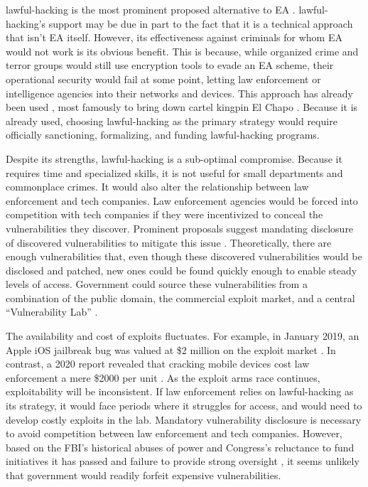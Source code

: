 \documentclass{IEEEtran}
\begin{document}
\Ac{lawful-hacking} is the most prominent proposed alternative to \ac{EA} \cite{bellovin_lawful_2013}
\cite{hennessey_lawful_2016} \cite{rozenshtein_wicked_2018} \cite{kerr_encryption_2017} \cite{soesanto_2018}.
\Ac{lawful-hacking}'s support may be due in part to the fact that it is a technical approach that isn't \ac{EA} itself.
However, its effectiveness against criminals for whom \ac{EA} would not work is its obvious benefit. This is because,
while organized crime and terror groups would still use encryption tools to evade an \ac{EA} scheme, their operational
security would fail at some point, letting law enforcement or intelligence agencies into their networks and devices.
This approach has already been used \cite{cox_2020}, most famously to bring down cartel kingpin El Chapo
\cite{feuer_chapo_2019}. Because it is already used, choosing \ac{lawful-hacking} as the primary strategy would require
officially sanctioning, formalizing, and funding \ac{lawful-hacking} programs.

Despite its strengths, \ac{lawful-hacking} is a sub-optimal compromise. Because it requires time and specialized skills,
it is not useful for small departments and commonplace crimes. It would also alter the relationship between law
enforcement and tech companies. Law enforcement agencies would be forced into competition with tech companies if they
were incentivized to conceal the vulnerabilities they discover. Prominent proposals suggest mandating disclosure of
discovered vulnerabilities to mitigate this issue \cite{bellovin_lawful_2013} \cite{hennessey_lawful_2016}.
Theoretically, there are enough vulnerabilities that, even though these discovered vulnerabilities would be disclosed and
patched, new ones could be found quickly enough to enable steady levels of access. Government could source these
vulnerabilities from a combination of the public domain, the commercial exploit market, and a central ``Vulnerability
Lab'' \cite{bellovin_lawful_2013}.

The availability and cost of exploits fluctuates. For example, in January 2019, an Apple iOS jailbreak bug was valued at
\$2 million on the exploit market \cite{goodin_zeroday_2019}. In contrast, a 2020 report revealed that cracking mobile
devices cost law enforcement a mere \$2000 per unit \cite{koepke_2020}. As the exploit arms race continues,
exploitability will be inconsistent. If law enforcement relies on \ac{lawful-hacking} as its strategy, it would face
periods where it struggles for access, and would need to develop costly exploits in the lab. Mandatory vulnerability
disclosure is necessary to avoid competition between law enforcement and tech companies. However, based on the
\ac{FBI}'s historical abuses of power \cite{shamsi_2011} and Congress's reluctance to fund initiatives it has passed
\cite{keller_internet_2019} and failure to provide strong oversight \cite{johnson_congressional_2004}, it seems unlikely
that government would readily forfeit expensive vulnerabilities.
\end{document}
